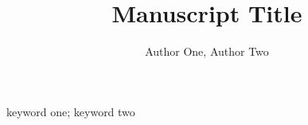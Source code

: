 \documentclass[journal,twoside,web]{ieeecolor}
\begin{document}
\title{Manuscript Title}
\author{Author One, Author Two}
\maketitle
\begin{abstract}\end{abstract}
\begin{IEEEkeywords}keyword one; keyword two\end{IEEEkeywords}

\nocite{example2026}


\end{document}
